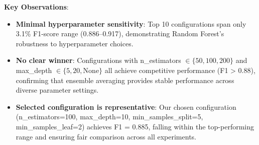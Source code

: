 \begin{table}[h]
\centering
\caption{Top 10 Random Forest Hyperparameter Configurations}
\label{tab:rf_grid_search_top10}
\end{table}

\textbf{Key Observations}:

\begin{itemize}
    \item \textbf{Minimal hyperparameter sensitivity}: Top 10 configurations span only 3.1\% F1-score range (0.886--0.917), demonstrating Random Forest's robustness to hyperparameter choices.

    \item \textbf{No clear winner}: Configurations with n\_estimators $\in \{50, 100, 200\}$ and max\_depth $\in \{5, 20, \text{None}\}$ all achieve competitive performance (F1 > 0.88), confirming that ensemble averaging provides stable performance across diverse parameter settings.

    \item \textbf{Selected configuration is representative}: Our chosen configuration (n\_estimators=100, max\_depth=10, min\_samples\_split=5, min\_samples\_leaf=2) achieves F1 = 0.885, falling within the top-performing range and ensuring fair comparison across all experiments.
\end{itemize}

